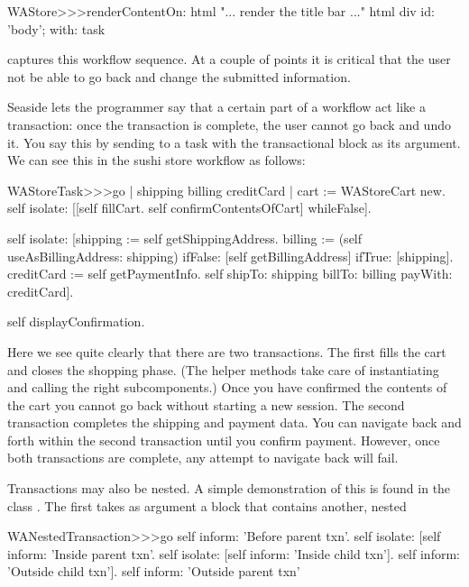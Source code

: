 \documentclass[a4paper,10pt,twoside]{book}
\begin{document}
{{\begin{code}{}
WAStore>>>renderContentOn: html
	"... render the title bar ..."
	html div id: 'body'; with: task
\end{code}

 captures this workflow sequence. At a couple of points it is critical that the user not be able to go back and change the submitted information.


Seaside lets the programmer say that a certain part of a workflow act like a transaction: once the transaction is complete, the user cannot go back and undo it.
You say this by sending  to a task with the transactional block as its argument.
We can see this in the sushi store workflow as follows:

\begin{code}{}
WAStoreTask>>>go
	| shipping billing creditCard |
	cart := WAStoreCart new.
	self isolate:
		[[self fillCart.
		self confirmContentsOfCart]
			whileFalse].

	self isolate:
		[shipping := self getShippingAddress.
		billing := (self useAsBillingAddress: shipping)
					ifFalse: [self getBillingAddress]
					ifTrue: [shipping].
		creditCard := self getPaymentInfo.
		self shipTo: shipping billTo: billing payWith: creditCard].

	self displayConfirmation.
\end{code}

Here we see quite clearly that there are two transactions.
The first fills the cart and closes the shopping phase.
(The helper methods  \etc take care of instantiating and calling the right subcomponents.)
Once you have confirmed the contents of the cart you cannot go back without starting a new session.
The second transaction completes the shipping and payment data.
You can navigate back and forth within the second transaction until you confirm payment.
However, once both transactions are complete, any attempt to navigate back will fail.

Transactions may also be nested.
A simple demonstration of this is found in the class .
The first  takes as argument a block that contains another, nested 

\begin{code}{}
WANestedTransaction>>>go
	self inform: 'Before parent txn'.
	self isolate:
			[self inform: 'Inside parent txn'.
			self isolate: [self inform: 'Inside child txn'].
			self inform: 'Outside child txn'].
	self inform: 'Outside parent txn'
\end{code}

}}
\end{document}
